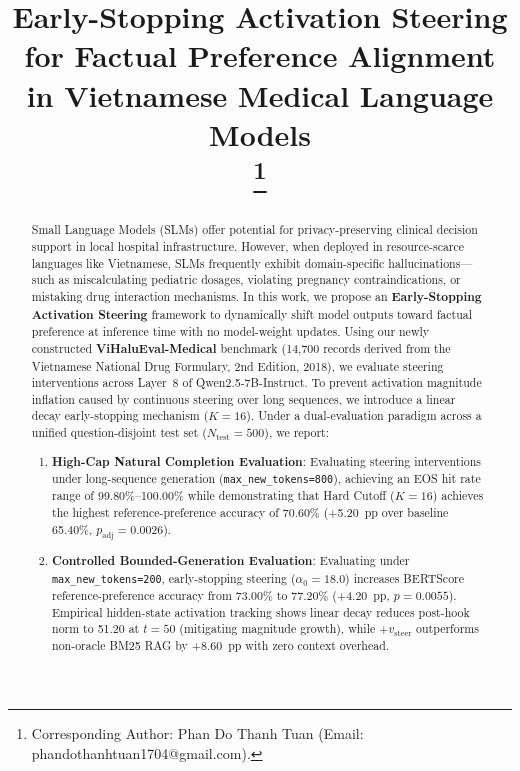 \documentclass[conference]{IEEEtran}
\begin{document}
\title{Early-Stopping Activation Steering for Factual Preference Alignment in Vietnamese Medical Language Models\\
\thanks{Corresponding Author: Phan Do Thanh Tuan (Email: phandothanhtuan1704@gmail.com).}
}

\author{
}

\maketitle

\begin{abstract}
Small Language Models (SLMs) offer potential for privacy-preserving clinical decision support in local hospital infrastructure. However, when deployed in resource-scarce languages like Vietnamese, SLMs frequently exhibit domain-specific hallucinations---such as miscalculating pediatric dosages, violating pregnancy contraindications, or mistaking drug interaction mechanisms. In this work, we propose an \textbf{Early-Stopping Activation Steering} framework to dynamically shift model outputs toward factual preference at inference time with no model-weight updates. Using our newly constructed \textbf{ViHaluEval-Medical} benchmark (14,700 records derived from the Vietnamese National Drug Formulary, 2nd Edition, 2018), we evaluate steering interventions across Layer~8 of Qwen2.5-7B-Instruct. To prevent activation magnitude inflation caused by continuous steering over long sequences, we introduce a linear decay early-stopping mechanism ($K=16$). Under a dual-evaluation paradigm across a unified question-disjoint test set ($N_{\text{test}}=500$), we report:
\begin{enumerate}
    \item \textbf{High-Cap Natural Completion Evaluation}: Evaluating steering interventions under long-sequence generation (\texttt{max\_new\_tokens=800}), achieving an EOS hit rate range of 99.80\%--100.00\% while demonstrating that Hard Cutoff ($K=16$) achieves the highest reference-preference accuracy of 70.60\% (+5.20~pp over baseline 65.40\%, $p_{\text{adj}}=0.0026$).
    \item \textbf{Controlled Bounded-Generation Evaluation}: Evaluating under \texttt{max\_new\_tokens=200}, early-stopping steering ($\alpha_0=18.0$) increases BERTScore reference-preference accuracy from 73.00\% to 77.20\% (+4.20~pp, $p=0.0055$). Empirical hidden-state activation tracking shows linear decay reduces post-hook norm to 51.20 at $t=50$ (mitigating magnitude growth), while $+v_{\text{steer}}$ outperforms non-oracle BM25 RAG by +8.60~pp with zero context overhead.
\end{enumerate}
\end{abstract}
\end{document}

